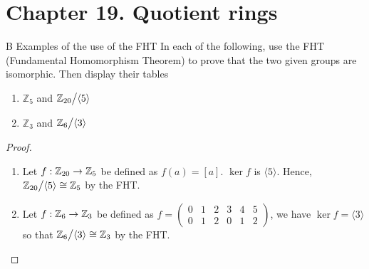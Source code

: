 \section*{Chapter 19. Quotient rings}


\begin{exercise}{B Examples of the use of the FHT}
In each of the following, use the FHT (Fundamental Homomorphism Theorem) to prove that the two given groups are isomorphic. Then display their tables
  \begin{enumerate}
      \item $\mathbb{Z}_{5}$ and ${\textstyle \mathbb{Z}_{20}}\big/{\textstyle \langle 5\rangle}$
      \item $\mathbb{Z}_{3}$ and ${\textstyle \mathbb{Z}_{6}}\big/{\textstyle \langle 3\rangle}$
  \end{enumerate}
\end{exercise}
\begin{proof}
 \begin{enumerate}
     \item Let $f:\mathbb{Z}_{20}\rightarrow\mathbb{Z}_{5}$ be defined as $f(a)=[a]$. $\ker f$ is $\langle 5\rangle$. Hence, ${\textstyle \mathbb{Z}_{20}}\big/{\textstyle \langle 5\rangle}\cong\mathbb{Z}_{5}$ by the FHT.
     \item Let $f:\mathbb{Z}_{6}\rightarrow\mathbb{Z}_{3}$ be defined as $f=
     \begin{pmatrix}
     0 & 1 & 2 & 3 & 4 & 5\\
     0 & 1 & 2 & 0 & 1 & 2
     \end{pmatrix}$, we have $\ker f=\langle 3 \rangle$ so that ${\textstyle \mathbb{Z}_{6}}\big/{\textstyle \langle 3\rangle}\cong\mathbb{Z}_{3}$ by the FHT.
 \end{enumerate}
\end{proof}



